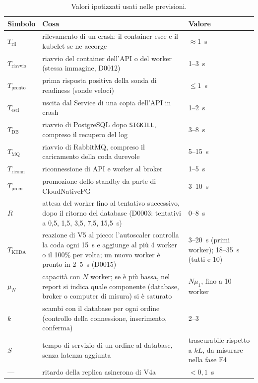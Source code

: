 \begin{table}[htbp]
\centering
\caption{Valori ipotizzati usati nelle previsioni.}
\label{tab:ipotesi}
\begin{tabularx}{\linewidth}{@{}lLl@{}}
\toprule
\textbf{Simbolo} & \textbf{Cosa} & \textbf{Valore} \\
\midrule
$T_{\text{ril}}$ & rilevamento di un crash: il container esce e il kubelet se ne accorge & $\approx 1$~s \\
$T_{\text{riavvio}}$ & riavvio del container dell'API o del worker (stessa immagine, D0012) & 1--3~s \\
$T_{\text{pronto}}$ & prima risposta positiva della sonda di readiness (sonde veloci) & $\le 1$~s \\
$T_{\text{escl}}$ & uscita dal Service di una copia dell'API in crash & 1--2~s \\
$T_{\text{DB}}$ & riavvio di PostgreSQL dopo \texttt{SIGKILL}, compreso il recupero del log & 3--8~s \\
$T_{\text{MQ}}$ & riavvio di RabbitMQ, compreso il caricamento della coda durevole & 5--15~s \\
$T_{\text{riconn}}$ & riconnessione di API e worker al broker & 1--5~s \\
$T_{\text{prom}}$ & promozione dello standby da parte di CloudNativePG & 3--10~s \\
$R$ & attesa del worker fino al tentativo successivo, dopo il ritorno del database (D0003: tentativi a 0,5, 1,5, 3,5, 7,5, 15,5~s) & 0--8~s \\
$T_{\text{KEDA}}$ & reazione di V5 al picco: l'autoscaler controlla la coda ogni 15~s e aggiunge al più 4 worker o il 100\% per volta; un nuovo worker è pronto in 2--5~s (D0015) & 3--20~s (primi worker); 18--35~s (tutti e 10) \\
$\mu_N$ & capacità con $N$ worker; se è più bassa, nel report si indica quale componente (database, broker o computer di misura) si è saturato & $N\mu_1$, fino a 10 worker \\
$k$ & scambi con il database per ogni ordine (controllo della connessione, inserimento, conferma) & 2--3 \\
$S$ & tempo di servizio di un ordine al database, senza latenza aggiunta & trascurabile rispetto a $kL$, da misurare nella fase F4 \\
--- & ritardo della replica asincrona di V4a & $< 0{,}1$~s \\
\bottomrule
\end{tabularx}
\end{table}


